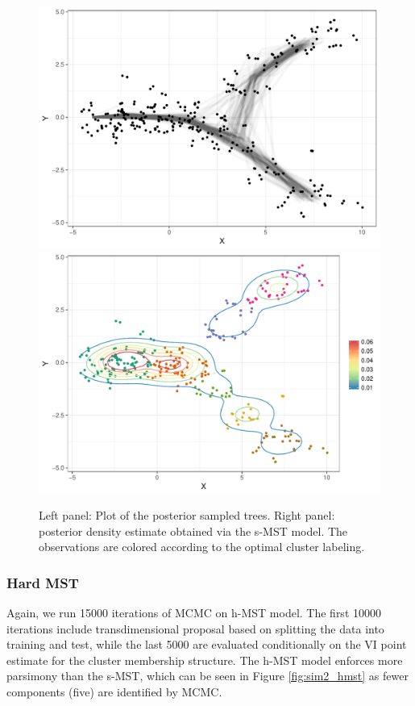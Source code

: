 \begin{figure}[!ht]
  \centering
  \includegraphics[width=.49\linewidth]{Img/Sim_slingshot/posterior_trees}
  \includegraphics[width=.49\linewidth]{Img/Sim_slingshot/posterior_estimate}
\caption{Left panel: Plot of the posterior sampled trees. Right panel: posterior density estimate obtained via the s-MST model. The observations are colored according to the optimal cluster labeling.}
\label{fig:sim2_groups}
\end{figure}

\subsubsection*{Hard MST}
 
Again, we run 15000 iterations of MCMC on h-MST model. The first 10000 iterations include transdimensional proposal based on splitting the data into training and test, while the last 5000 are evaluated conditionally on the VI point estimate for the cluster membership structure. The h-MST model enforces more parsimony than the s-MST, which can be seen in Figure \ref{fig:sim2_hmst} as fewer components (five) are identified by MCMC.


